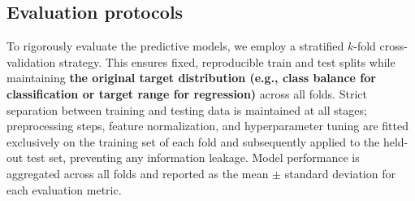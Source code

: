\subsection{Evaluation protocols}
To rigorously evaluate the predictive models, we employ a stratified $k$-fold cross-validation strategy. 
This ensures fixed, reproducible train and test splits while maintaining \textbf{the original target distribution 
(e.g., class balance for classification or target range for regression)} across all folds. Strict 
separation between training and testing data is maintained at all stages; preprocessing steps, feature 
normalization, and hyperparameter tuning are fitted exclusively on the training set of each fold and 
subsequently applied to the held-out test set, preventing any information leakage. Model performance is 
aggregated across all folds and reported as the mean $\pm$ standard deviation for each evaluation metric. 


